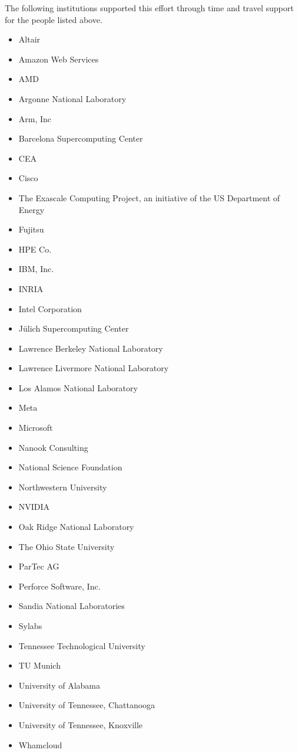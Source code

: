 The following institutions supported this effort through time and travel support for the people listed above.

\begin{itemize}
    \item Altair
    \item Amazon Web Services
    \item AMD
    \item Argonne National Laboratory
    \item Arm, Inc
    \item Barcelona Supercomputing Center
    \item CEA
    \item Cisco
    \item The Exascale Computing Project, an initiative of the US Department of Energy
    \item Fujitsu
    \item HPE Co.
    \item IBM, Inc.
    \item INRIA
    \item Intel Corporation
    \item Jülich Supercomputing Center
    \item Lawrence Berkeley National Laboratory
    \item Lawrence Livermore National Laboratory
    \item Los Alamos National Laboratory
    \item Meta
    \item Microsoft
    \item Nanook Consulting
    \item National Science Foundation
    \item Northwestern University
    \item NVIDIA
    \item Oak Ridge National Laboratory
    \item The Ohio State University
    \item ParTec AG
    \item Perforce Software, Inc.
    \item Sandia National Laboratories
    \item Sylabs
    \item Tennessee Technological University
    \item TU Munich
    \item University of Alabama
    \item University of Tennessee, Chattanooga
    \item University of Tennessee, Knoxville
    \item Whamcloud
\end{itemize}

